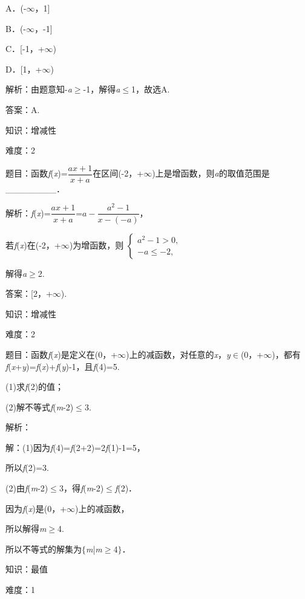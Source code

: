 \documentclass{article} %
\begin{document}
A．(-$\mathrm{\infty}$，1]   

B．(-$\mathrm{\infty}$，-1]

C．[-1，+$\mathrm{\infty}$)   

D．[1，+$\mathrm{\infty}$)

解析：由题意知-\textit{a}$\mathrm{\ge}$-1，解得\textit{a}$\mathrm{\le}$1，故选A.

答案：A.

知识：增减性

难度：2

题目：函数\textit{f}(\textit{x})=$\dfrac{ax+1}{x+a}$在区间(-2，+$\mathrm{\infty}$)上是增函数，则\textit{a}的取值范围是\_\_\_\_\_\_\_\_．

解析：\textit{f}(\textit{x})=$\dfrac{ax+1}{x+a}$=$a-\dfrac{a^{2}-1}{x-(-a)}$，

若\textit{f}(\textit{x})在(-2，+$\mathrm{\infty}$)为增函数，则
$\left\{
\begin{array}{l}
	a^{2}-1>0, \\
	-a\le -2,
\end{array}
\right.$


解得\textit{a}$\mathrm{\ge}$2.

答案：[2，+$\mathrm{\infty}$).

知识：增减性

难度：2

题目：函数\textit{f}(\textit{x})是定义在(0，+$\mathrm{\infty}$)上的减函数，对任意的\textit{x}，\textit{y}$\mathrm{\in}$(0，+$\mathrm{\infty}$)，都有\textit{f}(\textit{x}+\textit{y})=\textit{f}(\textit{x})+\textit{f}(\textit{y})-1，且\textit{f}(4)=5.

(1)求\textit{f}(2)的值；

(2)解不等式\textit{f}(\textit{m}-2)$\mathrm{\le}$3.

解析：

解：(1)因为\textit{f}(4)=\textit{f}(2+2)=2\textit{f}(1)-1=5，

所以\textit{f}(2)=3.

(2)由\textit{f}(\textit{m}-2)$\mathrm{\le}$3，得\textit{f}(\textit{m}-2)$\mathrm{\le}$\textit{f}(2)．

因为\textit{f}(\textit{x})是(0，+$\mathrm{\infty}$)上的减函数，

所以解得\textit{m}$\mathrm{\ge}$4.

所以不等式的解集为$\mathrm{\{}$\textit{m}|\textit{m}$\mathrm{\ge}$4$\mathrm{\}}$．


知识：最值

难度：1
\end{document}
